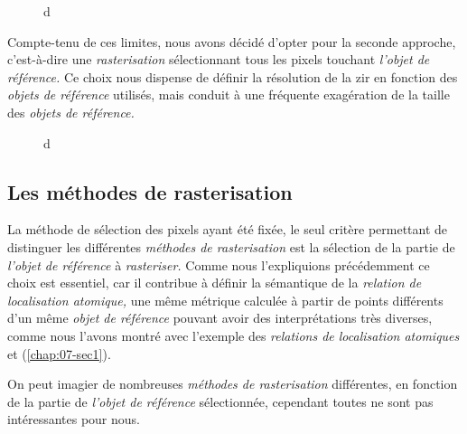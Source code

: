 \begin{figure}
  \centering
  
  \caption{d}
  \label{fig:rasterisation_sel_pixels}
\end{figure}

Compte-tenu de ces limites, nous avons décidé d'opter pour la seconde approche, c'est-à-dire une \emph{rasterisation} sélectionnant tous les pixels touchant \emph{l'objet de référence.} Ce choix nous dispense de définir la résolution de la \ac{zir} en fonction des \emph{objets de référence} utilisés, mais conduit à une fréquente exagération de la taille des \emph{objets de référence.}

\begin{figure}
  \centering
  
  \caption{d}
  \label{fig:rasterisation_cas_limite}
\end{figure}

\subsection{Les méthodes de rasterisation}

La méthode de sélection des pixels ayant été fixée, le seul critère permettant de distinguer les différentes \emph{méthodes de rasterisation} est la sélection de la partie de \emph{l'objet de référence} à \emph{rasteriser.} Comme nous l'expliquions précédemment ce choix est essentiel, car il contribue à définir la sémantique de la \emph{relation de localisation atomique,} une même métrique calculée à partir de points différents d'un même \emph{objet de référence} pouvant avoir des interprétations très diverses, comme nous l'avons montré avec l'exemple des \emph{relations de localisation atomiques}  et  (\autoref{chap:07-sec1}).

On peut imagier de nombreuses \emph{méthodes de rasterisation} différentes, en fonction de la partie de \emph{l'objet de référence} sélectionnée, cependant toutes ne sont pas intéressantes pour nous.



